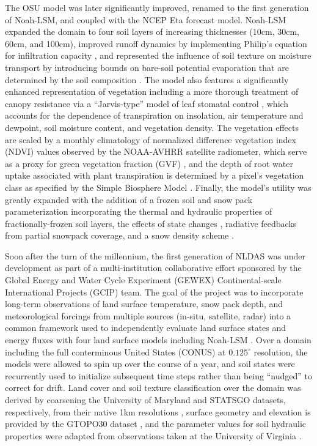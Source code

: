 The OSU model was later significantly improved, renamed to the first generation of Noah-LSM, and coupled with the NCEP Eta forecast model. Noah-LSM expanded the domain to four soil layers of increasing thicknesses (10cm, 30cm, 60cm, and 100cm), improved runoff dynamics by implementing Philip's equation for infiltration capacity \citep{schaake_simple_1996}, and represented the influence of soil texture on moisture transport by introducing bounds on bare-soil potential evaporation that are determined by the soil composition \citep{betts_assessment_1997} \citep{mahfouf_comparative_1991}. The model also features a significantly enhanced representation of vegetation including a more thorough treatment of canopy resistance via a ``Jarvis-type'' model of leaf stomatal control \citep{jarvis_interpretation_1976} \citep{jacquemin_sensitivity_1990}, which accounts for the dependence of transpiration on insolation, air temperature and dewpoint, soil moisture content, and vegetation density. The vegetation effects are scaled by a monthly climatology of normalized difference vegetation index (NDVI) values observed by the NOAA-AVHRR satellite radiometer, which serve as a proxy for green vegetation fraction (GVF) \citep{gutman_derivation_1998} \citep{chen_modeling_1996}, and the depth of root water uptake associated with plant transpiration is determined by a pixel's vegetation class as specified by the Simple Biosphere Model \citep{dorman_global_1989}. Finally, the model's utility was greatly expanded with the addition of a frozen soil and snow pack parameterization incorporating the thermal and hydraulic properties of fractionally-frozen soil layers, the effects of state changes \citep{koren_parameterization_1999}, radiative feedbacks from partial snowpack coverage, and a snow density scheme \citep{ek_implementation_2003}.

Soon after the turn of the millennium, the first generation of NLDAS was under development as part of a multi-institution collaborative effort sponsored by the Global Energy and Water Cycle Experiment (GEWEX) Continental-scale International Projects (GCIP) team. The goal of the project was to incorporate long-term observations of land surface temperature, snow pack depth, and meteorological forcings from multiple sources (in-situ, satellite, radar) into a common framework used to independently evaluate land surface states and energy fluxes with four land surface models including Noah-LSM \citep{mitchell_multi-institution_2004}. Over a domain including the full conterminous United States (CONUS) at $0.125^\circ$ resolution, the models were allowed to spin up over the course of a year, and soil states were recurrently used to initialize subsequent time steps rather than being ``nudged'' to correct for drift. Land cover and soil texture classification over the domain was derived by coarsening the University of Maryland and STATSGO datasets, respectively, from their native 1km resolutions \citep{hansen_global_2000}, surface geometry and elevation is provided by the GTOPO30 dataset \citep{earth_resources_observation_and_science_centeru_s_geological_surveyu_s_department_of_the_interior_usgs_1997}, and the parameter values for soil hydraulic properties were adapted from observations taken at the University of Virginia \citep{cosby_statistical_1984}.

